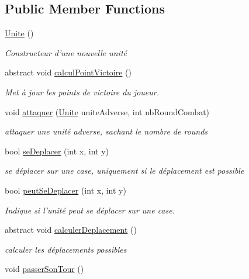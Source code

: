 \subsection*{Public Member Functions}
\begin{DoxyCompactItemize}
\item 
\hyperlink{class_small_world_1_1_unite_aba2c2f3a6b478fc56ecd87c508691898}{Unite} ()
\begin{DoxyCompactList}\small\item\em Constructeur d'une nouvelle unité \end{DoxyCompactList}\item 
\hypertarget{class_small_world_1_1_unite_a6031713608e138c55f064935f8b47e22}{abstract void \hyperlink{class_small_world_1_1_unite_a6031713608e138c55f064935f8b47e22}{calcul\-Point\-Victoire} ()}\label{class_small_world_1_1_unite_a6031713608e138c55f064935f8b47e22}

\begin{DoxyCompactList}\small\item\em Met à jour les points de victoire du joueur. \end{DoxyCompactList}\item 
void \hyperlink{class_small_world_1_1_unite_af370920ab6c2b9478f0c12d7f1d22638}{attaquer} (\hyperlink{class_small_world_1_1_unite}{Unite} unite\-Adverse, int nb\-Round\-Combat)
\begin{DoxyCompactList}\small\item\em attaquer une unité adverse, sachant le nombre de rounds \end{DoxyCompactList}\item 
bool \hyperlink{class_small_world_1_1_unite_abc3a49225b122d3dc3579883d433d300}{se\-Deplacer} (int x, int y)
\begin{DoxyCompactList}\small\item\em se déplacer sur une case, uniquement si le déplacement est possible \end{DoxyCompactList}\item 
bool \hyperlink{class_small_world_1_1_unite_a26f648e9ca7776ade3e8c335644ed8f1}{peut\-Se\-Deplacer} (int x, int y)
\begin{DoxyCompactList}\small\item\em Indique si l'unité peut se déplacer sur une case. \end{DoxyCompactList}\item 
abstract void \hyperlink{class_small_world_1_1_unite_a88ea1d2d5962c08ffc15422a2f2c7bbf}{calculer\-Deplacement} ()
\begin{DoxyCompactList}\small\item\em calculer les déplacements possibles \end{DoxyCompactList}\item 
\hypertarget{class_small_world_1_1_unite_a56cc6f226c95d7510748dd4c3a948076}{void \hyperlink{class_small_world_1_1_unite_a56cc6f226c95d7510748dd4c3a948076}{passer\-Son\-Tour} ()}\label{class_small_world_1_1_unite_a56cc6f226c95d7510748dd4c3a948076}


\end{DoxyCompactItemize}
